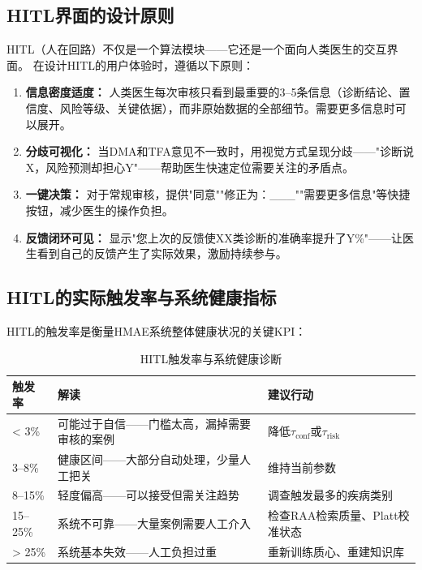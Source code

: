 \documentclass[11pt,a4paper]{ctexart}
\begin{document}
\subsection{HITL界面的设计原则}

HITL（人在回路）不仅是一个算法模块——它还是一个面向人类医生的交互界面。
在设计HITL的用户体验时，遵循以下原则：

\begin{enumerate}[nosep]
\item \textbf{信息密度适度：} 人类医生每次审核只看到最重要的3--5条信息（诊断结论、置信度、风险等级、关键依据），而非原始数据的全部细节。需要更多信息时可以展开。
\item \textbf{分歧可视化：} 当DMA和TFA意见不一致时，用视觉方式呈现分歧——"诊断说X，风险预测却担心Y"——帮助医生快速定位需要关注的矛盾点。
\item \textbf{一键决策：} 对于常规审核，提供"同意""修正为：\_\_\_""需要更多信息"等快捷按钮，减少医生的操作负担。
\item \textbf{反馈闭环可见：} 显示"您上次的反馈使XX类诊断的准确率提升了Y\%"——让医生看到自己的反馈产生了实际效果，激励持续参与。
\end{enumerate}

\subsection{HITL的实际触发率与系统健康指标}

HITL的触发率是衡量HMAE系统整体健康状况的关键KPI：

\begin{table}[H]
\centering
\small
\begin{tabular}{lp{5cm}p{5cm}}
\toprule
\textbf{触发率} & \textbf{解读} & \textbf{建议行动} \\
\midrule
< 3\% & 可能过于自信——门槛太高，漏掉需要审核的案例 & 降低$\tau_{\text{conf}}$或$\tau_{\text{risk}}$ \\
3--8\% & 健康区间——大部分自动处理，少量人工把关 & 维持当前参数 \\
8--15\% & 轻度偏高——可以接受但需关注趋势 & 调查触发最多的疾病类别 \\
15--25\% & 系统不可靠——大量案例需要人工介入 & 检查RAA检索质量、Platt校准状态 \\
> 25\% & 系统基本失效——人工负担过重 & 重新训练质心、重建知识库 \\
\bottomrule
\end{tabular}
\caption{HITL触发率与系统健康诊断}
\end{table}
\end{document}

